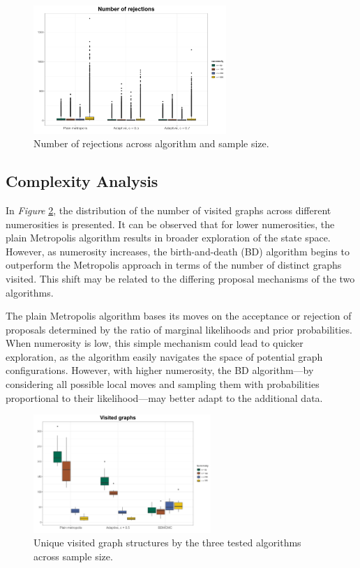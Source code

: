 \documentclass{report}
\begin{document}
\begin{figure}[h] 
	\centering
	\includegraphics[width=0.65\textwidth]{Figures/Overall_comparison/Boxplot_rejected.png}
	\caption{Number of rejections across algorithm and sample size.}
	\label{fig:rejections}
\end{figure}

\subsection{Complexity Analysis}

In \textit{Figure} \ref{fig:box-visit-graphs}, the distribution of the number of visited graphs across different numerosities is presented. It can be observed that for lower numerosities, the plain Metropolis algorithm results in broader exploration of the state space. However, as numerosity increases, the birth-and-death (BD) algorithm begins to outperform the Metropolis approach in terms of the number of distinct graphs visited. This shift may be related to the differing proposal mechanisms of the two algorithms.

The plain Metropolis algorithm bases its moves on the acceptance or rejection of proposals determined by the ratio of marginal likelihoods and prior probabilities. When numerosity is low, this simple mechanism could lead to quicker exploration, as the algorithm easily navigates the space of potential graph configurations. However, with higher numerosity, the BD algorithm—by considering all possible local moves and sampling them with probabilities proportional to their likelihood—may better adapt to the additional data. 

\begin{figure}[h] 
	\centering
	\includegraphics[width=0.6\textwidth]{Figures/Diagnostic/Boxplot_visit_graphs_org.png}
	\caption{Unique visited graph structures by the three tested algorithms across sample size.}
	\label{fig:box-visit-graphs}
\end{figure}
\end{document}
